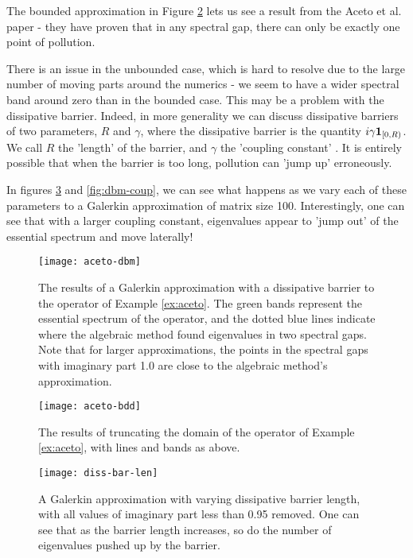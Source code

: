 \documentclass[../main.tex]{subfiles}
\begin{document}
The bounded approximation in Figure \ref{fig:aceto-bdd} lets us see a result from
the Aceto et al. paper - they have proven that in any spectral gap, there can only
be exactly one point of pollution.

There is an issue in the unbounded case, which is hard to resolve due to the large number of
moving parts around the numerics - we seem to have a wider spectral band around zero than
in the bounded case.
This may be a problem with the dissipative barrier. Indeed, in more generality we can discuss
dissipative barriers of two parameters, $R$ and $\gamma$, where the dissipative barrier is the
quantity $i \gamma \mathbf{1}_{[0, R)}$. We call $R$ the 'length' of the barrier, and $\gamma$ the
'coupling constant' \cite{stepanenko2022spectral}. It is entirely possible that when the barrier
is too long, pollution can 'jump up' erroneously.

In figures \ref{fig:dbm-len} and \ref{fig:dbm-coup}, we can see what happens as we vary each of
these parameters to a Galerkin approximation of matrix size 100.
Interestingly, one can see that with a larger coupling constant, eigenvalues
appear to 'jump out' of the essential spectrum and move laterally!

\begin{figure}[h!]
\centering
\texttt{[image: aceto-dbm]}
\caption{The results of a Galerkin approximation with a dissipative
	barrier to the operator of Example \ref{ex:aceto}. The green bands
	represent the essential spectrum of the operator, and the dotted blue
	lines indicate where the algebraic method found eigenvalues in two
	spectral gaps. Note that for larger approximations, the points in the
	spectral gaps with imaginary part 1.0 are close to the algebraic
	method's approximation.}
\label{fig:aceto-dbm}
\end{figure}

\begin{figure}[h!]
\centering
\texttt{[image: aceto-bdd]}
\caption{The results of truncating the domain of
  the operator of Example \ref{ex:aceto}, with lines and bands
  as above.}
\label{fig:aceto-bdd}
\end{figure}

\begin{figure}[p!]
  \centering
  \texttt{[image: diss-bar-len]}
  \caption{A Galerkin approximation with varying dissipative barrier length,
  with all values of imaginary part less than 0.95 removed. One can see that
  as the barrier length increases, so do the number of eigenvalues pushed up
  by the barrier.}
  \label{fig:dbm-len}
\end{figure}
\end{document}
